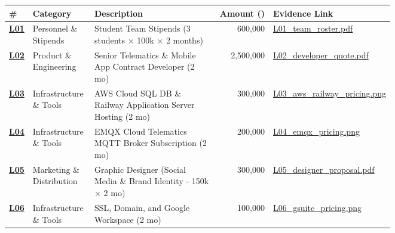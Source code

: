 \documentclass[11pt,a4paper]{article}
\begin{document}
\renewcommand{\arraystretch}{1.3}
{\footnotesize
\begin{longtable}{p{0.05\linewidth} p{0.16\linewidth} p{0.32\linewidth} r p{0.22\linewidth}}
    \toprule
    \textbf{\#} & \textbf{Category} & \textbf{Description} & \textbf{Amount (\text{₦})} & \textbf{Evidence Link} \\
    \midrule
    \href{https://drive.google.com/drive/folders/safebox_window1_evidence/L01_team_roster.pdf}{\textbf{L01}} & Personnel \& Stipends & Student Team Stipends (3 students $\times$ \text{₦}100k $\times$ 2 months) & 600,000 & \href{https://drive.google.com/drive/folders/safebox_window1_evidence/L01_team_roster.pdf}{L01\_team\_roster.pdf} \\
    \href{https://drive.google.com/drive/folders/safebox_window1_evidence/L02_developer_quote.pdf}{\textbf{L02}} & Product \& Engineering & Senior Telematics \& Mobile App Contract Developer (2 mo) & 2,500,000 & \href{https://drive.google.com/drive/folders/safebox_window1_evidence/L02_developer_quote.pdf}{L02\_developer\_quote.pdf} \\
    \href{https://drive.google.com/drive/folders/safebox_window1_evidence/L03_aws_railway_pricing.png}{\textbf{L03}} & Infrastructure \& Tools & AWS Cloud SQL DB \& Railway Application Server Hosting (2 mo) & 300,000 & \href{https://drive.google.com/drive/folders/safebox_window1_evidence/L03_aws_railway_pricing.png}{L03\_aws\_railway\_pricing.png} \\
    \href{https://drive.google.com/drive/folders/safebox_window1_evidence/L04_emqx_pricing.png}{\textbf{L04}} & Infrastructure \& Tools & EMQX Cloud Telematics MQTT Broker Subscription (2 mo) & 200,000 & \href{https://drive.google.com/drive/folders/safebox_window1_evidence/L04_emqx_pricing.png}{L04\_emqx\_pricing.png} \\
    \href{https://drive.google.com/drive/folders/safebox_window1_evidence/L05_designer_proposal.pdf}{\textbf{L05}} & Marketing \& Distribution & Graphic Designer (Social Media \& Brand Identity - \text{₦}150k $\times$ 2 mo) & 300,000 & \href{https://drive.google.com/drive/folders/safebox_window1_evidence/L05_designer_proposal.pdf}{L05\_designer\_proposal.pdf} \\
    \href{https://drive.google.com/drive/folders/safebox_window1_evidence/L06_gsuite_pricing.png}{\textbf{L06}} & Infrastructure \& Tools & SSL, Domain, and Google Workspace (2 mo) & 100,000 & \href{https://drive.google.com/drive/folders/safebox_window1_evidence/L06_gsuite_pricing.png}{L06\_gsuite\_pricing.png} \\

\end{longtable}}
\end{document}
